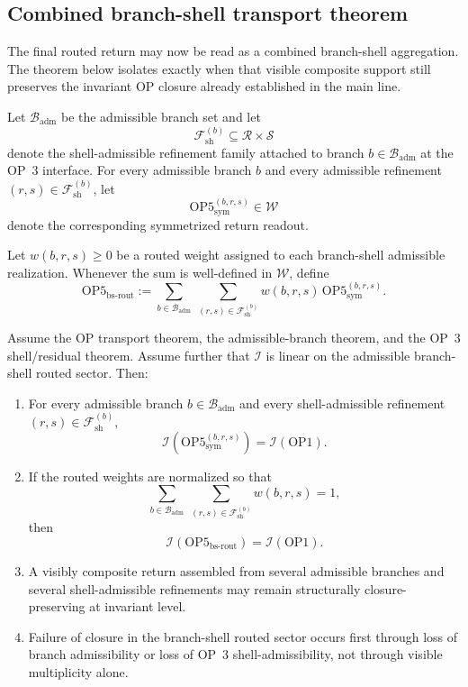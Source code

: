 \subsection{Combined branch-shell transport theorem}
\label{sec:combined-branch-shell-theorem}

The final routed return may now be read as a combined branch-shell aggregation. The theorem below isolates exactly when that visible composite support still preserves the invariant OP closure already established in the main line.

Let $\mathcal{B}_{\mathrm{adm}}$ be the admissible branch set and let
\[
\mathcal{F}_{\mathrm{sh}}^{(b)}\subseteq \mathcal{R}\times\mathcal{S}
\]
denote the shell-admissible refinement family attached to branch $b\in\mathcal{B}_{\mathrm{adm}}$ at the OP~3 interface. For every admissible branch $b$ and every admissible refinement $(r,s)\in\mathcal{F}_{\mathrm{sh}}^{(b)}$, let
\[
\mathrm{OP5}^{(b,r,s)}_{\mathrm{sym}}\in\mathcal{W}
\]
denote the corresponding symmetrized return readout.

\begin{definition}
Let $w(b,r,s)\ge 0$ be a routed weight assigned to each branch-shell admissible realization. Whenever the sum is well-defined in $\mathcal{W}$, define
\[
\mathrm{OP5}_{\mathrm{bs\text{-}rout}}
:=
\sum_{b\in\mathcal{B}_{\mathrm{adm}}}
\ \sum_{(r,s)\in\mathcal{F}_{\mathrm{sh}}^{(b)}}
 w(b,r,s)\,\mathrm{OP5}^{(b,r,s)}_{\mathrm{sym}}.
\]
\end{definition}

\begin{theorem}
\label{thm:combined-branch-shell}
Assume the OP transport theorem, the admissible-branch theorem, and the OP~3 shell/residual theorem. Assume further that $\mathcal{I}$ is linear on the admissible branch-shell routed sector. Then:
\begin{enumerate}[leftmargin=2em,label=(\roman*)]
\item For every admissible branch $b\in\mathcal{B}_{\mathrm{adm}}$ and every shell-admissible refinement $(r,s)\in\mathcal{F}_{\mathrm{sh}}^{(b)}$,
\[
\mathcal{I}(\mathrm{OP5}^{(b,r,s)}_{\mathrm{sym}})=\mathcal{I}(\mathrm{OP1}).
\]
\item If the routed weights are normalized so that
\[
\sum_{b\in\mathcal{B}_{\mathrm{adm}}}\ \sum_{(r,s)\in\mathcal{F}_{\mathrm{sh}}^{(b)}} w(b,r,s)=1,
\]
then
\[
\mathcal{I}(\mathrm{OP5}_{\mathrm{bs\text{-}rout}})=\mathcal{I}(\mathrm{OP1}).
\]
\item A visibly composite return assembled from several admissible branches and several shell-admissible refinements may remain structurally closure-preserving at invariant level.
\item Failure of closure in the branch-shell routed sector occurs first through loss of branch admissibility or loss of OP~3 shell-admissibility, not through visible multiplicity alone.
\end{enumerate}
\end{theorem}

